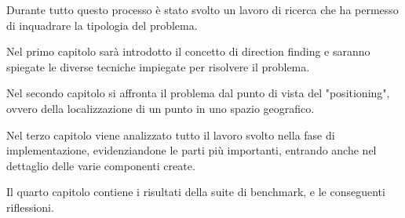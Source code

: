 Durante tutto questo processo è stato svolto un lavoro di ricerca che ha permesso di inquadrare la tipologia del problema.

Nel primo capitolo sarà introdotto il concetto di direction finding e saranno spiegate le diverse tecniche impiegate per risolvere il problema. 

Nel secondo capitolo si affronta il problema dal punto di vista del "positioning", ovvero della localizzazione di un punto in uno spazio geografico. 

Nel terzo capitolo viene analizzato tutto il lavoro svolto nella fase di implementazione, evidenziandone le parti più importanti, entrando anche nel dettaglio delle varie componenti create.

Il quarto capitolo contiene i risultati della suite di benchmark, e le conseguenti riflessioni.